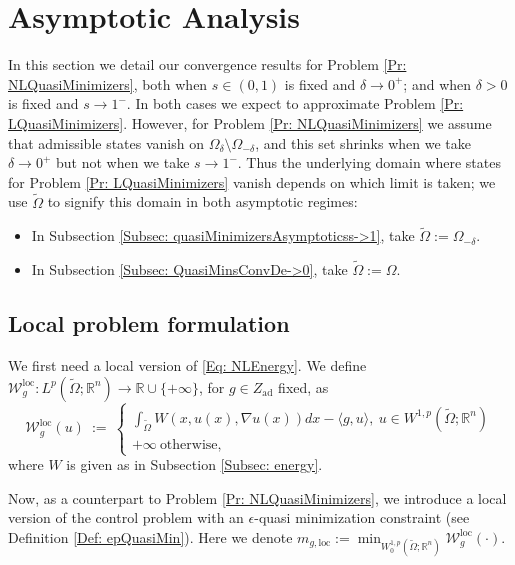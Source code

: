 \documentclass[11pt, reqno]{amsart}   	%
\theoremstyle{plain}
\numberwithin{equation}{section}
\def\de{\delta}
\def\ep{\epsilon}
\def\Om{\Omega}
\def\R{\mathbb{R}}
\def\grad{\nabla}
\def\lang{\langle}
\def\rang{\rangle}
\def\loc{\text{loc}}
\begin{document}

\section{Asymptotic Analysis}\label{Sec: quasiMinimizersAsymptotics}

In this section we detail our convergence results for Problem \ref{Pr: NLQuasiMinimizers}, both when $s \in (0, 1)$ is fixed and $\de \rightarrow 0^+$; and when $\de > 0$ is fixed and $s \rightarrow 1^-$. In both cases we expect to approximate Problem \ref{Pr: LQuasiMinimizers}. However, for Problem \ref{Pr: NLQuasiMinimizers} we assume that admissible states vanish on $\Om_{\de}\setminus \Om_{-\de}$, and this set shrinks when we take $\de \rightarrow 0^+$ but not when we take $s \rightarrow 1^-$. Thus the underlying domain where states for Problem \ref{Pr: LQuasiMinimizers} vanish depends on which limit is taken; we use $\widetilde{\Om}$ to signify this domain in both asymptotic regimes:
\begin{itemize}
    \item In Subsection \ref{Subsec: quasiMinimizersAsymptoticss->1}, take $\widetilde{\Om} := \Om_{-\de}$.
    \item In Subsection \ref{Subsec: QuasiMinsConvDe->0}, take $\widetilde{\Om} := \Om$.
\end{itemize}


\subsection{Local problem formulation}\label{Subsec: LProblemFormulation}

We first need a local version of \eqref{Eq: NLEnergy}. We define $\mathcal{W}^{\loc}_g: L^p(\widetilde{\Om}; \R^n) \rightarrow \R \cup \{+\infty\}$, for $g\in Z_{\text{ad}}$ fixed, as
	\begin{equation}\label{Eq: GenEnergyL}
		\mathcal{W}^{\loc}_g(u)\ := \ \begin{cases}
			\int_{\widetilde{\Om}}W(x, u(x), \grad u(x))dx - \lang g, u\rang, \ u \in W^{1, p}(\widetilde{\Om}; \R^n) \\
			+\infty  \ \text{otherwise},
		\end{cases}
	\end{equation}
    where $W$ is given as in Subsection \ref{Subsec: energy}.


Now, as a counterpart to Problem \ref{Pr: NLQuasiMinimizers}, we introduce a local version of the control problem with an $\ep$-quasi minimization constraint (see Definition \ref{Def: epQuasiMin}). Here we denote $m_{g, \loc} := \min_{W^{1, p}_0(\widetilde{\Om}; \R^n)}\mathcal{W}^{\loc}_g(\cdot)$.
\end{document}
